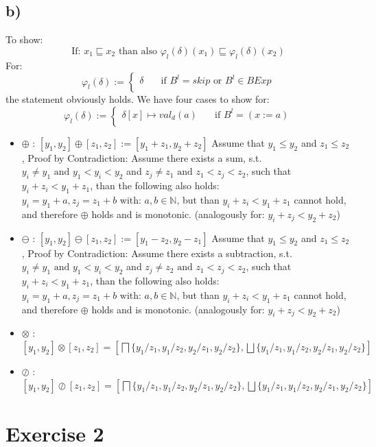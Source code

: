 \documentclass[fleqn,12pt]{article}
\begin{document}
\subsection*{b)}
To show:
$$\text{If: }x_1 \sqsubseteq x_2 \text{ than also } \varphi_l(\delta)(x_1) \sqsubseteq \varphi_l(\delta)(x_2)$$
For:
\[ \varphi_l(\delta) :=
  \begin{cases}
    \delta       & \quad \text{if } B^l = skip \text{ or } B^l \in BExp\\
  \end{cases}
\]
the statement obviously holds.
We have four cases to show for:
\[ \varphi_l(\delta) :=
  \begin{cases}
    \delta [x] \mapsto val_d(a) & \quad \text{if } B^l=(x:=a)\\
  \end{cases}
\]
\begin{itemize}
	\item{$\oplus$ :} $[y_1,y_2] \oplus [z_1,z_2] := [y_1+z_1,y_2+z_2]$ Assume that $y_1 \leq y_2$ and $z_1 \leq z_2$, Proof by Contradiction: Assume there exists a sum, s.t. $y_i \neq y_1 \text{ and } y_1<y_i<y_2$ and $z_j \neq z_1 \text{ and } z_1<z_j<z_2$, such that $y_i+z_i<y_1+z_1$, than the following also holds: $y_i=y_1+a,z_j=z_1+b \text{ with: } a,b\in \mathbb{N}$, but than $y_i+z_i<y_1+z_1$ cannot hold, and therefore $\oplus$ holds and is monotonic. (analogously for: $y_i+z_j<y_2+z_2$)
	\item{$\ominus$ :} $[y_1,y_2] \ominus [z_1,z_2] := [y_1-z_2,y_2-z_1]$ Assume that $y_1 \leq y_2$ and $z_1 \leq z_2$, Proof by Contradiction: Assume there exists a subtraction, s.t. $y_i \neq y_1 \text{ and } y_1<y_i<y_2$ and $z_j \neq z_2 \text{ and } z_1<z_j<z_2$, such that $y_i+z_i<y_1+z_1$, than the following also holds: $y_i=y_1+a,z_j=z_1+b \text{ with: } a,b\in \mathbb{N}$, but than $y_i+z_i<y_1+z_1$ cannot hold, and therefore $\oplus$ holds and is monotonic. (analogously for: $y_i+z_j<y_2+z_2$)
	\item{$\otimes$ :} $[y_1,y_2] \otimes [z_1,z_2]=[\bigsqcap\{y_1/z_1,y_1/z_2,y_2/z_1,y_2/z_2\},\bigsqcup\{y_1/z_1,y_1/z_2,y_2/z_1,y_2/z_2\}]$
	\item{$\oslash$ :} $[y_1,y_2] \oslash [z_1,z_2]=[\bigsqcap\{y_1/z_1,y_1/z_2,y_2/z_1,y_2/z_2\},\bigsqcup\{y_1/z_1,y_1/z_2,y_2/z_1,y_2/z_2\}]$
\end{itemize}

\section*{Exercise 2}
\end{document}

